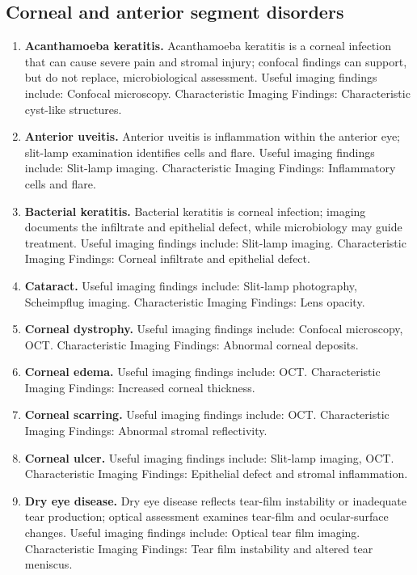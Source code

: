 \subsection{Corneal and anterior segment disorders}
\begin{enumerate}[leftmargin=*,itemsep=0.45em,topsep=0.4em]
\item \textbf{Acanthamoeba keratitis.} Acanthamoeba keratitis is a corneal infection that can cause severe pain and stromal injury; confocal findings can support, but do not replace, microbiological assessment. Useful imaging findings include: Confocal microscopy. Characteristic Imaging Findings: Characteristic cyst-like structures.
\item \textbf{Anterior uveitis.} Anterior uveitis is inflammation within the anterior eye; slit-lamp examination identifies cells and flare. Useful imaging findings include: Slit-lamp imaging. Characteristic Imaging Findings: Inflammatory cells and flare.
\item \textbf{Bacterial keratitis.} Bacterial keratitis is corneal infection; imaging documents the infiltrate and epithelial defect, while microbiology may guide treatment. Useful imaging findings include: Slit-lamp imaging. Characteristic Imaging Findings: Corneal infiltrate and epithelial defect.
\item \textbf{Cataract.} Useful imaging findings include: Slit-lamp photography, Scheimpflug imaging. Characteristic Imaging Findings: Lens opacity.
\item \textbf{Corneal dystrophy.} Useful imaging findings include: Confocal microscopy, OCT. Characteristic Imaging Findings: Abnormal corneal deposits.
\item \textbf{Corneal edema.} Useful imaging findings include: OCT. Characteristic Imaging Findings: Increased corneal thickness.
\item \textbf{Corneal scarring.} Useful imaging findings include: OCT. Characteristic Imaging Findings: Abnormal stromal reflectivity.
\item \textbf{Corneal ulcer.} Useful imaging findings include: Slit-lamp imaging, OCT. Characteristic Imaging Findings: Epithelial defect and stromal inflammation.
\item \textbf{Dry eye disease.} Dry eye disease reflects tear-film instability or inadequate tear production; optical assessment examines tear-film and ocular-surface changes. Useful imaging findings include: Optical tear film imaging. Characteristic Imaging Findings: Tear film instability and altered tear meniscus.

\end{enumerate}
